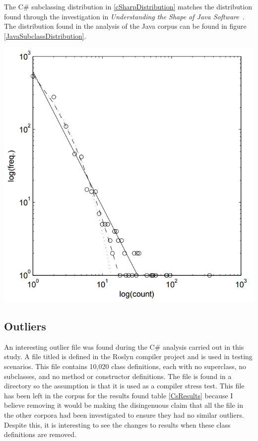 The C\# subclassing distribution in \ref{cSharpDistribution} matches the distribution found through the investigation in \textit{Understanding the Shape of Java Software}~\cite{ShapeOfJava}. The distribution found in the analysis of the Java corpus can be found in figure \ref{JavaSubclassDistribution}.

\begin{center}
	\label{JavaSubclassDistribution}
	\includegraphics[scale=0.50]{SubclassDistributionJava.png}
\end{center}

\subsection{Outliers}
An interesting outlier file was found during the C\# analysis carried out in this study. A file titled  is defined in the Roslyn compiler project and is used in testing scenarios. This file contains 10,020 class definitions, each with no superclass, no subclasses, and no method or constructor definitions. The file is found in a  directory so the assumption is that it is used as a compiler stress test. This file has been left in the corpus for the results found table \ref{CsResults} because I believe removing it would be making the disingenuous claim that all the file in the other corpora had been investigated to ensure they had no similar outliers. Despite this, it is interesting to see the changes to results when these class definitions are removed.

